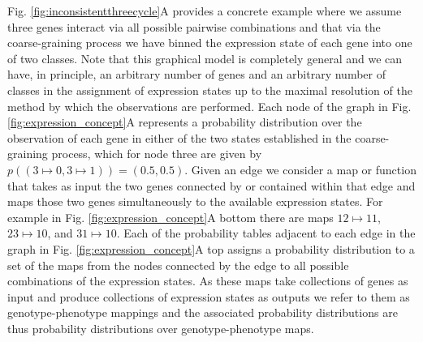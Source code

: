 Fig. \ref{fig:inconsistentthreecycle}A provides a concrete example where we assume three genes interact via all possible pairwise combinations and that via the coarse-graining process we have binned the expression state of each gene into one of two classes. Note that this graphical model is completely general and we can have, in principle, an arbitrary number of genes and an arbitrary number of classes in the assignment of expression states up to the maximal resolution of the method by which the observations are performed. Each node of the graph in Fig. \ref{fig:expression_concept}A represents a probability distribution over the observation of each gene in either of the two states established in the coarse-graining process, which for node three are given by $p((3 \mapsto 0, 3 \mapsto 1))=(0.5,0.5)$. Given an edge we consider a map or function that takes as input the two genes connected by or contained within that edge and maps those two genes simultaneously to the available expression states. For example in Fig. \ref{fig:expression_concept}A bottom there are maps $12 \mapsto 11$, $23 \mapsto 10$, and $31 \mapsto 10$. Each of the probability tables adjacent to each edge in the graph in Fig. \ref{fig:expression_concept}A top assigns a probability distribution to a set of the maps from the nodes connected by the edge to all possible combinations of the expression states. As these maps take collections of genes as input and produce collections of expression states as outputs we refer to them as genotype-phenotype mappings and the associated probability distributions are thus probability distributions over genotype-phenotype maps.

